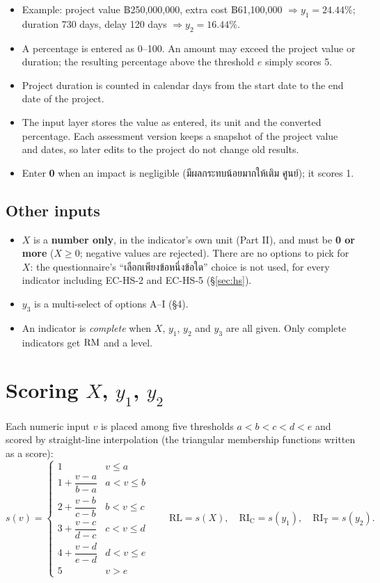 \documentclass[10pt,a4paper]{article}
\newcommand{\RL}{\mathrm{RL}}\newcommand{\RIC}{\mathrm{RI_C}}\newcommand{\RIT}{\mathrm{RI_T}}\newcommand{\RIE}{\mathrm{RI_E}}
\begin{document}
\begin{itemize}[leftmargin=1.4em,labelwidth=1em,align=left]
\item[•] Example: project value ฿250,000,000, extra cost ฿61,100,000 $\Rightarrow y_1=24.44\%$; duration 730 days, delay 120 days $\Rightarrow y_2=16.44\%$.
\item[•] A percentage is entered as 0--100. An amount may exceed the project value or duration; the resulting percentage above the threshold $e$ simply scores 5.
\item[•] Project duration is counted in calendar days from the start date to the end date of the project.
\item[•] The input layer stores the value as entered, its unit and the converted percentage. Each assessment version keeps a snapshot of the project value and dates, so later edits to the project do not change old results.
\item[•] Enter \textbf{0} when an impact is negligible (มีผลกระทบน้อยมากให้เติม ศูนย์); it scores 1.
\end{itemize}

\subsection*{Other inputs}
\begin{itemize}[leftmargin=1.4em,labelwidth=1em,align=left]
\item[•] $X$ is a \textbf{number only}, in the indicator's own unit (Part II), and must be \textbf{0 or more} ($X\ge0$; negative values are rejected). There are no options to pick for $X$: the questionnaire's ``เลือกเพียงข้อหนึ่งข้อใด'' choice is not used, for every indicator including EC-HS-2 and EC-HS-5 (§\ref{sec:hs}).
\item[•] $y_3$ is a multi-select of options A--I (§4).
\item[•] An indicator is \emph{complete} when $X$, $y_1$, $y_2$ and $y_3$ are all given. Only complete indicators get $\mathrm{RM}$ and a level.
\end{itemize}

\section{Scoring \texorpdfstring{$X$, $y_1$, $y_2$}{X, y1, y2}}\label{sec:score}
Each numeric input $v$ is placed among five thresholds $a<b<c<d<e$ and scored by straight-line interpolation (the triangular membership functions written as a score):
\[
s(v)=\begin{cases}
1 & v\le a\\[2pt]
1+\dfrac{v-a}{b-a} & a<v\le b\\[8pt]
2+\dfrac{v-b}{c-b} & b<v\le c\\[8pt]
3+\dfrac{v-c}{d-c} & c<v\le d\\[8pt]
4+\dfrac{v-d}{e-d} & d<v\le e\\[2pt]
5 & v>e
\end{cases}
\qquad
\RL=s(X),\quad \RIC=s(y_1),\quad \RIT=s(y_2).
\]
\end{document}
